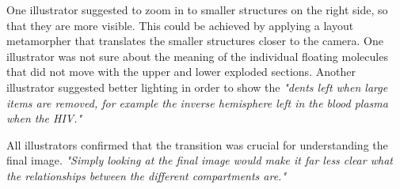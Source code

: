 One illustrator suggested to zoom in to smaller structures on the right side, so that they are more visible. This could be achieved by applying a layout metamorpher that translates the smaller structures closer to the camera. One illustrator was not sure about the meaning of the individual floating molecules that did not move with the upper and lower exploded sections. Another illustrator suggested better lighting in order to show the \textit{"dents left when large items are removed, for example the inverse hemisphere left in the blood plasma when the HIV."}

All illustrators confirmed that the transition was crucial for understanding the final image. \textit{"Simply looking at the final image would make it far less clear what the relationships between the different compartments are."}










